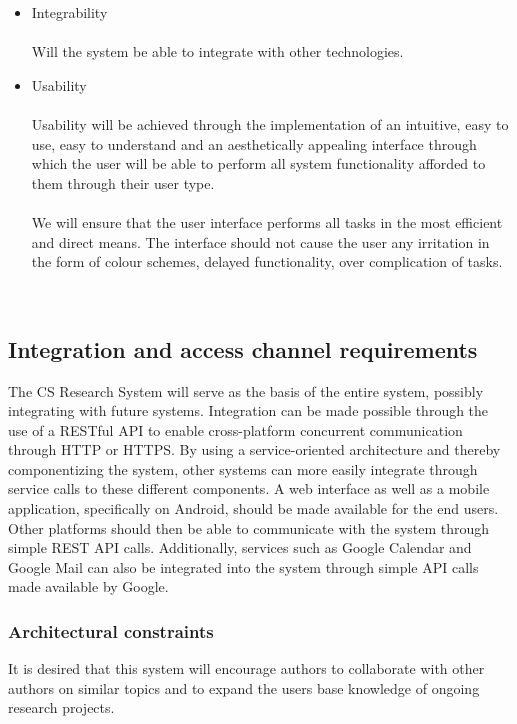 \documentclass[a4paper]{article}
\begin{document}
\begin{itemize}
\begin{itemize}
        
    \item Integrability \\\\
        Will the system be able to integrate with other technologies.
    \item Usability \\\\
        Usability will be achieved through the implementation of an intuitive, easy to use, easy to understand and an aesthetically appealing interface through which the user will be able to perform all system functionality afforded to them through their user type.
        \\\\
        We will ensure that the user interface performs all tasks in the most efficient and direct means. The interface should not cause the user any irritation in the form of colour schemes, delayed functionality, over complication of tasks.
 \end{itemize}
\\

\subsection{Integration and access channel requirements}
    The CS Research System will serve as the basis of the entire system, possibly integrating with future systems. Integration can be made possible through the use of a RESTful API to enable cross-platform concurrent communication through HTTP or HTTPS. By using a service-oriented architecture and thereby componentizing the system, other systems can more easily integrate through service calls to these different components. A web interface as well as a mobile application, specifically on Android, should be made available for the end users. Other platforms should then be able to communicate with the system through simple REST API calls. Additionally, services such as Google Calendar and Google Mail can also be integrated into the system through simple API calls made available by Google. 
\\
    
\subsubsection{Architectural constraints}
   It is desired that this system will encourage authors to collaborate with other authors on similar topics and to expand the users base knowledge of ongoing research projects.
\\
    \\
    \\
    

\end{itemize}
\end{document}
